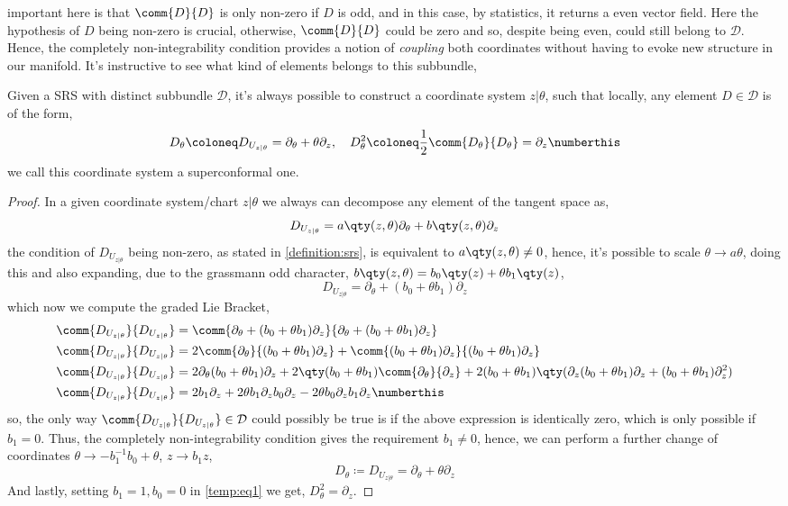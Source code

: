 important here is that $\comm{D}{D}$ is only non-zero if $D$ is odd, and in this case, by statistics, it returns 
a even vector field. Here the hypothesis of $D$ being non-zero is crucial, otherwise, $\comm{D}{D}$ could be 
zero and so, despite being even, could still belong to $\mathcal D$. Hence, the completely non-integrability 
condition provides a notion of \textit{coupling} both coordinates without having to evoke new structure in 
our manifold. It's instructive to see what kind of elements belongs to this subbundle,
\begin{lemma}
    Given a SRS with distinct subbundle $\mathcal D$, it's always possible to construct a 
    coordinate system $z|\theta$, such that locally, any element $D\in\mathcal D$ is of the 
    form, \[D_\theta\coloneq D_{U_{z|\theta}}=\partial_\theta+\theta\partial_z,\ \ \ D_\theta^2\coloneq\frac12\comm{D_\theta}{D_\theta}=\partial_z\numberthis\label{covariantderivative}\] we call 
    this coordinate system a superconformal one.
\end{lemma}
\begin{proof}
    In a given coordinate system/chart $z|\theta$ we always can decompose any element of the tangent space as,
    $$D_{U_{z|\theta}}=a\qty(z,\theta)\partial_\theta+b\qty(z,\theta)\partial_z$$ the condition of $D_{U_{z|\theta}}$ being 
    non-zero, as stated in \cref{definition:srs}, is equivalent to $a\qty(z,\theta)\neq 0$, hence, it's possible to scale 
    $\theta\rightarrow a\theta$, doing this and also expanding, due to the grassmann odd character, 
    $b\qty(z,\theta)=b_0\qty(z)+\theta b_1\qty(z)$, 
    $$D_{U_{z|\theta}}=\partial_\theta+(b_0+\theta b_1)\partial_z$$ which now we compute the graded Lie Bracket,
    \begin{align*}
        \comm{D_{U_{z|\theta}}}{D_{U_{z|\theta}}}&=\comm{\partial_\theta+(b_0+\theta b_1)\partial_z}{\partial_\theta+(b_0+\theta b_1)\partial_z}\\
        \comm{D_{U_{z|\theta}}}{D_{U_{z|\theta}}}&=2\comm{\partial_\theta}{(b_0+\theta b_1)\partial_z}+\comm{(b_0+\theta b_1)\partial_z}{(b_0+\theta b_1)\partial_z}\\
        \comm{D_{U_{z|\theta}}}{D_{U_{z|\theta}}}&=2\partial_\theta(b_0+\theta b_1)\partial_z+2\qty(b_0+\theta b_1)\comm{\partial_\theta}{\partial_z}+2(b_0+\theta b_1)\qty(\partial_z(b_0+\theta b_1)\partial_z+(b_0+\theta b_1)\partial^2_z)\\
        \comm{D_{U_{z|\theta}}}{D_{U_{z|\theta}}}&=2b_1\partial_z+2\theta b_1\partial_z b_0\partial_z-2\theta b_0\partial_z b_1\partial_z\numberthis\label{temp:eq1}
    \end{align*}
    so, the only way $\comm{D_{U_{z|\theta}}}{D_{U_{z|\theta}}}\in\mathcal D$ could possibly be true is if the above expression is identically zero, which is 
    only possible if $b_1=0$. Thus, the completely non-integrability condition gives the requirement $b_1\neq 0$, hence, we can perform a 
    further change of coordinates $\theta\rightarrow -b_1^{-1}b_0+\theta$, $z\rightarrow b_1 z$,
    $$D_{\theta}\coloneq D_{U_{z|\theta}}=\partial_\theta+\theta \partial_z$$ And lastly, 
    setting $b_1=1, b_0=0$ in \cref{temp:eq1} we get, $D^2_\theta = \partial_z$.
\end{proof}
